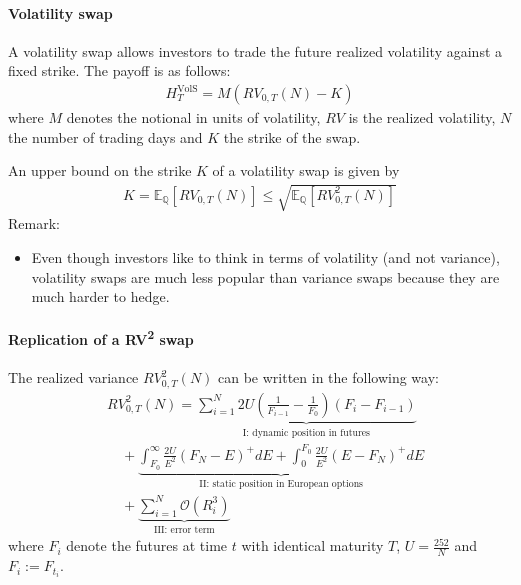 \documentclass[a4paper,landscape,7pt,fleqn]{scrartcl}
\begin{document}
\begin{multicols*}{3}
\paragraph{Volatility swap}
A volatility swap allows investors to trade the future realized volatility against a fixed strike. The payoff is as follows:
\begin{align*}
H_T^\text{VolS} = M(RV_{0,T}(N) - K)
\end{align*}
where $M$ denotes the notional in units of volatility, $RV$ is the realized volatility, $N$ the number of trading days and $K$ the strike of the swap.

An upper bound on the strike $K$ of a volatility swap is given by
\begin{align*}
K = \mathbb{E}_\mathbb{Q}[RV_{0,T}(N)] \leq \sqrt{\mathbb{E}_\mathbb{Q}[RV_{0,T}^2(N)]}
\end{align*}
Remark:
\begin{itemize}
\item Even though investors like to think in terms of volatility (and not variance), volatility swaps are much less popular than variance swaps because they are much harder to hedge.
\end{itemize}

\paragraph{Replication of a RV\textsuperscript{2} swap}
The realized variance $RV_{0,T}^2(N)$ can be written in the following way:
\begin{align*}
& RV_{0,T}^2(N) = \underbrace{\sum_{i=1}^N 2U \left( \frac{1}{F_{i-1}} - \frac{1}{F_0} \right) (F_i - F_{i-1})}_\text{I: dynamic position in futures} \\
& \quad + \underbrace{\int_{F_0}^\infty \frac{2 U}{E^2} (F_N - E)^+ dE + \int_0^{F_0} \frac{2 U}{E^2} (E - F_N)^+ dE}_\text{II: static position in European options} \\
& \quad + \underbrace{\sum_{i=1}^N \mathcal{O}(R_i^3)}_\text{III: error term}
\end{align*}
where $F_i$ denote the futures at time $t$ with identical maturity $T$, $U = \frac{252}{N}$ and $F_i := F_{t_i}$.


\end{multicols*}
\end{document}
